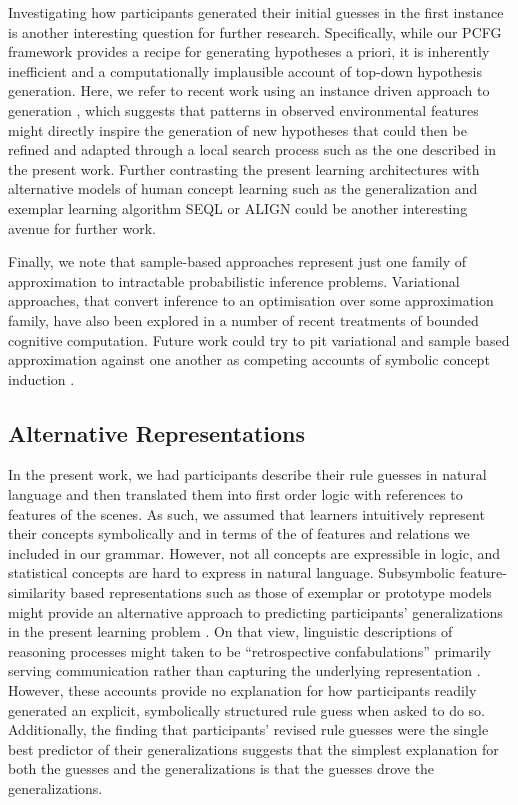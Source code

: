 \documentclass[doc,natbib,floatsintext]{apa7}
\begin{document}
Investigating how participants generated their initial guesses in the first instance is another interesting question for further research. Specifically, while our PCFG framework provides a recipe for generating hypotheses a priori, it is inherently inefficient and a computationally implausible account of top-down hypothesis generation. Here, we refer to recent work using an instance driven approach to generation \citep{bramley2018grounding}, which suggests that patterns in observed environmental features might directly inspire the generation of new hypotheses that could then be refined and adapted through a local search process such as the one described in the present work. Further contrasting the present learning architectures with alternative models of human concept learning such as the generalization and exemplar learning algorithm SEQL \citep{kuehne2000seql, skorstad1988abstraction} or ALIGN \citep{mclure2010learning} could be another interesting avenue for further work. 

Finally, we note that sample-based approaches represent just one family of approximation to intractable probabilistic inference problems. Variational approaches, that convert inference to an optimisation over some approximation family, have also been explored in a number of recent treatments of bounded cognitive computation. Future work could try to pit variational and sample based approximation against one another as competing accounts of symbolic concept induction \citep{sanborn2017types}.


\subsection{Alternative Representations}
In the present work, we had participants describe their rule guesses in natural language and then translated them into first order logic with references to features of the scenes. As such, we assumed that learners intuitively represent their concepts symbolically and
in terms of the of features and relations we included in our grammar. However, not all concepts are expressible in logic, and statistical concepts are hard to express in natural language. Subsymbolic feature-similarity based representations such as those of exemplar or prototype models might provide an alternative approach to predicting participants' generalizations in the present learning problem \citep{medin1978context,nosofsky1986attention,rosch1999principles}. On that view, linguistic descriptions of reasoning processes might taken to be ``retrospective confabulations'' primarily serving communication rather than capturing the underlying representation \citep{dennett1981making}.  
However, these accounts provide no explanation for how participants readily generated an explicit, symbolically structured rule guess when asked to do so. Additionally, the finding that participants' revised rule guesses were the single best predictor of their generalizations suggests that the simplest explanation for both the guesses and the generalizations is that the guesses drove the generalizations. 
\end{document}

